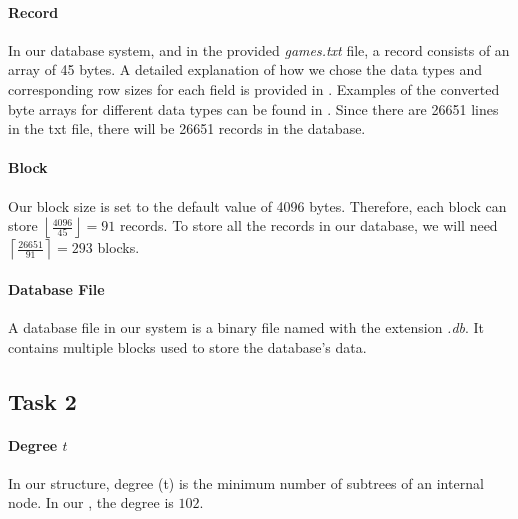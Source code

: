 \vspace{-2mm}

\paragraph{Record} In our database system, and in the provided \textit{games.txt} file, a record consists of an array of 45 bytes. A detailed explanation of how we chose the data types and corresponding row sizes for each field is provided in . Examples of the converted byte arrays for different data types can be found in . Since there are 26651 lines in the txt file, there will be 26651 records in the database.

\paragraph{Block} Our block size is set to the default value of 4096 bytes. Therefore, each block can store $\left\lfloor \frac{4096}{45} \right\rfloor = 91$ records. To store all the records in our database, we will need $\left\lceil\frac{26651}{91}\right\rceil = 293$ blocks.

\paragraph{Database File} A database file in our system is a binary file named with the extension \textit{.db}. It contains multiple blocks used to store the database’s data.


\subsection{Task 2}
\label{subsec:task-2}

\paragraph{Degree $t$} In our \bplustree structure, degree (t) is the minimum number of subtrees of an internal node. In our \bplustree, the degree is $102$.

